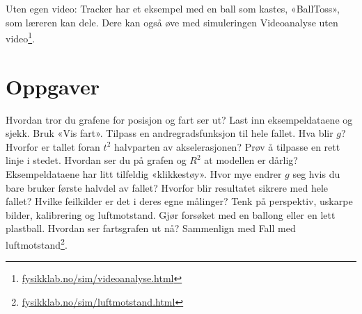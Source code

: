 \documentclass[11pt]{article}
\begin{document}
Uten egen video: Tracker har et eksempel med en ball som kastes, «BallToss», som læreren kan dele. Dere kan også øve med simuleringen Videoanalyse uten video\footnote{\url{fysikklab.no/sim/videoanalyse.html}}.

\section*{Oppgaver}

\begin{oppgaveliste}
\oppgave {}Hvordan tror du grafene for posisjon og fart ser ut? Last inn eksempeldataene og sjekk. Bruk «Vis fart».
\svar
\oppgave {}Tilpass en andregradsfunksjon til hele fallet. Hva blir $g$? Hvorfor er tallet foran $t^{2}$ halvparten av akselerasjonen?
\svar
\oppgave {}Prøv å tilpasse en rett linje i stedet. Hvordan ser du på grafen og $R^{2}$ at modellen er dårlig?
\svar
\oppgave {}Eksempeldataene har litt tilfeldig «klikkestøy». Hvor mye endrer $g$ seg hvis du bare bruker første halvdel av fallet? Hvorfor blir resultatet sikrere med hele fallet?
\svar
\oppgave {}Hvilke feilkilder er det i deres egne målinger? Tenk på perspektiv, uskarpe bilder, kalibrering og luftmotstand.
\svar
\oppgave {}Gjør forsøket med en ballong eller en lett plastball. Hvordan ser fartsgrafen ut nå? Sammenlign med Fall med luftmotstand\footnote{\url{fysikklab.no/sim/luftmotstand.html}}.
\svar
\end{oppgaveliste}
\end{document}
